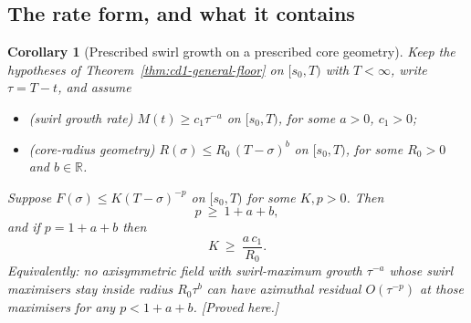 \documentclass[11pt]{article}
\newtheorem{corollary}[theorem]{Corollary}
\theoremstyle{definition}
\theoremstyle{remark}
\newcommand{\R}{\mathbb{R}}
\begin{document}
\subsection{The rate form, and what it contains}
\label{subsec:cd1-rate}

\begin{corollary}[Prescribed swirl growth on a prescribed core geometry]
  \label{cor:cd1-rate}
  Keep the hypotheses of Theorem~\ref{thm:cd1-general-floor} on
  $[s_0,T)$ with $T<\infty$, write $\tau=T-t$, and assume
  \begin{itemize}[leftmargin=2.6em]
    \item[\textbf{(G1)}] \emph{(swirl growth rate)}
      $M(t)\geq c_1\tau^{-a}$ on $[s_0,T)$, for some $a>0$, $c_1>0$;
    \item[\textbf{(G2)}] \emph{(core-radius geometry)}
      $R(\sigma)\leq R_0\,(T-\sigma)^{b}$ on $[s_0,T)$, for some
      $R_0>0$ and $b\in\R$.
  \end{itemize}
  Suppose $F(\sigma)\leq K(T-\sigma)^{-p}$ on $[s_0,T)$ for some
  $K,p>0$. Then
  \begin{equation}\label{eq:cd1-exponent}
    p\ \geq\ 1+a+b ,
  \end{equation}
  and if $p=1+a+b$ then
  \begin{equation}\label{eq:cd1-constant}
    K\ \geq\ \frac{a\,c_1}{R_0} .
  \end{equation}
  Equivalently: no axisymmetric field with swirl-maximum growth
  $\tau^{-a}$ whose swirl maximisers stay inside radius $R_0\tau^{b}$ can
  have azimuthal residual $O(\tau^{-p})$ at those maximisers for any
  $p<1+a+b$. \emph{[Proved here.]}
\end{corollary}
\end{document}
